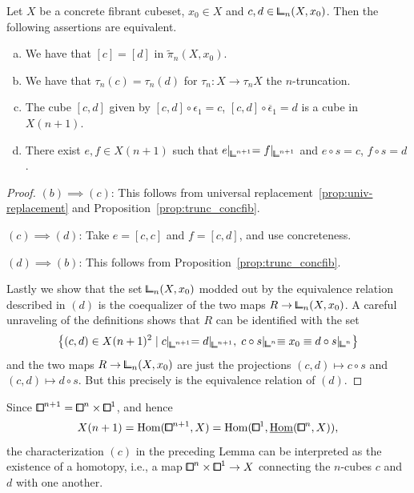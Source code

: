 \begin{lemma}\label{lem:concrete-equiv-rel-structure-monoid}
Let $X$ be a concrete fibrant cubeset, $x_0\in X$ and $c,d\in\bbcor_n(X,x_0)$.
Then the following assertions are equivalent.
\begin{enumerate}[(a)]
    \item We have that $[c] = [d]$ in $\tilde{\pi}_n(X,x_0)$.
    \item We have that $\tau_n(c) = \tau_n(d)$ for $\tau_n\colon X\to\tau_n X$ the $n$-truncation.
    \item The cube $[c,d]$ given by $[c,d]\circ\epsilon_1 = c$, $[c,d]\circ\overline{\epsilon}_1 = d$ is a cube in $X(n+1)$.
    \item There exist $e,f\in X(n+1)$ such that $e\lvert_{{\bbcor}^{n+1}} = f\lvert_{{\bbcor}^{n+1}}$
        and $e\circ s = c$, $f\circ s = d$.
\end{enumerate}
\end{lemma}

\begin{proof}
$(b)\implies(c)$: This follows from universal replacement~\ref{prop:univ-replacement} and Proposition~\ref{prop:trunc_concfib}.

$(c)\implies(d)$: Take $e = [c,c]$ and $f = [c,d]$, and use concreteness.

$(d)\implies(b)$: This follows from Proposition~\ref{prop:trunc_concfib}.

Lastly we show that the set $\bbcor_n(X,x_0)$ modded out by the equivalence relation described in $(d)$
is the coequalizer of the two maps $R\to\bbcor_n(X,x_0)$.
A careful unraveling of the definitions shows that $R$ can be identified with the set
\[
    \left\{ (c,d)\in X(n+1)^2 \mid c\lvert_{{\bbcor}^{n+1}} = d\lvert_{{\bbcor}^{n+1}},\; c\circ s\lvert_{{\bbcor}^n} \equiv x_0 \equiv d\circ s\lvert_{{\bbcor}^n} \right\}
\]
and the two maps $R\to\bbcor_n(X,x_0)$ are just the projections $(c,d)\mapsto c\circ s$ and $(c,d)\mapsto d\circ s$.
But this precisely is the equivalence relation of $(d)$.
\end{proof}

\begin{remark}
Since ${\bbox}^{n+1} = {\bbox}^n\times{\bbox}^1$, and hence
\[
    X(n+1) = \hom({\bbox}^{n+1},X) = \hom({\bbox}^1,\ihom({\bbox}^n,X)),
\]
the characterization $(c)$ in the preceding Lemma can be interpreted as the existence of a homotopy,
i.e., a map ${\bbox}^n\times{\bbox}^1\to X$ connecting the $n$-cubes $c$ and $d$ with one another.
\end{remark}

